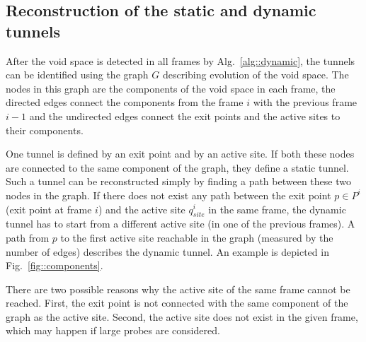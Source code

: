\documentclass[usletter, 10pt, conference]{svjour3}      %
\def\qinit{q_{site}}
\begin{document}
\subsection{Reconstruction of the static and dynamic tunnels}

After the void space is detected in all frames by Alg.~\ref{alg::dynamic}, the tunnels can be identified using the graph $G$ describing
evolution of the void space.
The nodes in this graph are the components of the void space in each frame, the directed edges connect the components from the frame $i$ with the previous frame $i-1$ and the undirected edges connect the exit points and the active sites to their components.

One tunnel is defined by an exit point and by an active site.
If both these nodes are connected to the same component of the graph, they define a static tunnel.
Such a tunnel can be reconstructed simply by finding a path between these two nodes in the graph.
If there does not exist any path between the exit point $p \in P^i$ (exit point at frame $i$) and the active site $\qinit^i$ in the same frame, the dynamic tunnel has to start from a different active site (in one of the previous frames).
A path from $p$ to the first active site reachable in the graph (measured by the number of edges) describes the dynamic tunnel.
An example is depicted in Fig.~\ref{fig::components}.

There are two possible reasons why the active site of the same frame cannot be reached.
First, the exit point is not connected with the same component of the graph as the active site.
Second, the active site does not exist in the given frame, which may happen if large probes are considered.
\end{document}
